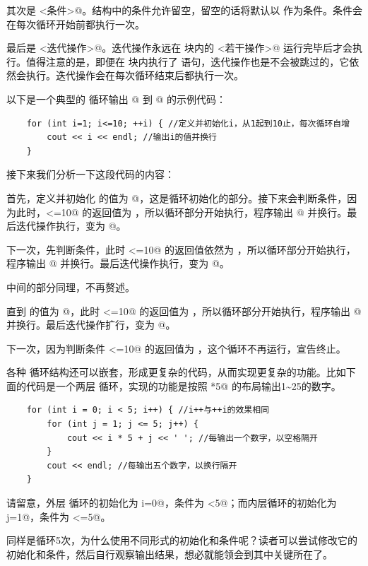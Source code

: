 其次是 \lstinline@<条件>@。\lstinline@for@ 结构中的条件允许留空，留空的话将默认以 \lstinline@true@ 作为条件。条件会在每次循环开始前都执行一次。\par
最后是 \lstinline@<迭代操作>@。迭代操作永远在 \lstinline@for@ 块内的 \lstinline@<若干操作>@ 运行完毕后才会执行。值得注意的是，即便在 \lstinline@for@ 块内执行了 \lstinline@continue@ 语句，迭代操作也是不会被跳过的，它依然会执行。迭代操作会在每次循环结束后都执行一次。\par
以下是一个典型的 \lstinline@for@ 循环输出 @ 到 @ 的示例代码：
\begin{lstlisting}
    for (int i=1; i<=10; ++i) { //定义并初始化i，从1起到10止，每次循环自增
        cout << i << endl; //输出i的值并换行
    }
\end{lstlisting}
接下来我们分析一下这段代码的内容：\par
首先，定义并初始化 \lstinline@i@ 的值为 @，这是循环初始化的部分。接下来会判断条件，因为此时，\lstinline@i<=10@ 的返回值为 \lstinline@true@，所以循环部分开始执行，程序输出 @ 并换行。最后迭代操作执行，\lstinline@i@ 变为 @。\par
下一次，先判断条件，此时 \lstinline@i<=10@ 的返回值依然为 \lstinline@true@，所以循环部分开始执行，程序输出 @ 并换行。最后迭代操作执行，\lstinline@i@ 变为 @。\par
中间的部分同理，不再赘述。\par
直到 \lstinline@i@ 的值为 @，此时 \lstinline@i<=10@ 的返回值为 \lstinline@true@，所以循环部分开始执行，程序输出 @ 并换行。最后迭代操作扩行，\lstinline@i@ 变为 @。\par
下一次，因为判断条件 \lstinline@i<=10@ 的返回值为 \lstinline@false@，这个循环不再运行，宣告终止。\par
各种 \lstinline@for@ 循环结构还可以嵌套，形成更复杂的代码，从而实现更复杂的功能。比如下面的代码是一个两层 \lstinline@for@ 循环，实现的功能是按照 *5@ 的布局输出1\~{}25的数字。\par
\begin{lstlisting}
    for (int i = 0; i < 5; i++) { //i++与++i的效果相同
        for (int j = 1; j <= 5; j++) {
            cout << i * 5 + j << ' '; //每输出一个数字，以空格隔开
        }
        cout << endl; //每输出五个数字，以换行隔开
    }
\end{lstlisting}\par
请留意，外层 \lstinline@for@ 循环的初始化为 \lstinline@int i=0@，条件为 \lstinline@i<5@；而内层循环的初始化为 \lstinline@int j=1@，条件为 \lstinline@j<=5@。\par
同样是循环5次，为什么使用不同形式的初始化和条件呢？读者可以尝试修改它的初始化和条件，然后自行观察输出结果，想必就能领会到其中关键所在了。\par
